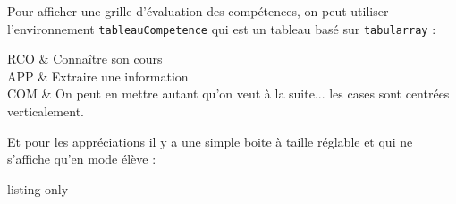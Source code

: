 
Pour afficher une grille d'évaluation des compétences, on peut utiliser l'environnement \lstinline|tableauCompetence| qui est un tableau basé sur \lstinline|tabularray| :
\begin{boiteCodeTex}{}
  \begin{tableauCompetences}
    RCO & Connaître son cours \\
    APP & Extraire une information \\
    COM & On peut en mettre autant qu'on veut à la suite... les cases sont centrées verticalement.
  \end{tableauCompetences}
\end{boiteCodeTex}

Et pour les appréciations il y a une simple boite à taille réglable et qui ne s'affiche qu'en mode élève :
\begin{boiteCodeTex}{}
  \appreciation{4 cm}
  \modeCorrection
  \appreciation{4 cm}
  \modeEleve
\end{boiteCodeTex}

\begin{boiteCodeTex}{listing only}
\end{boiteCodeTex}
